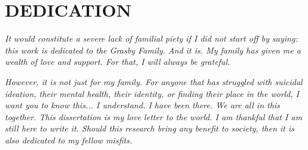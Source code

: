 %
%
%
%  
%

\chapter*{DEDICATION}

\begin{center}
\noindent \textit{It would constitute a severe lack of familial piety if I did not start off by saying: this work is dedicated to the Grasby Family. And it is. My family has given me a wealth of love and support. For that, I will always be grateful.}

\vspace{0.5cm}

\noindent \textit{However, it is not just for my family. For anyone that has struggled with suicidal ideation, their mental health, their identity, or finding their place in the world, I want you to know this... I understand. I have been there. We are all in this together. This dissertation is my love letter to the world. I am thankful that I am still here to write it. Should this research bring any benefit to society, then it is also dedicated to my fellow misfits.}

\vspace*{\fill}
\end{center}

\pagebreak{}